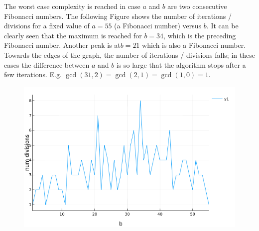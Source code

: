 The worst case complexity is reached in case $a$ and $b$ are two consecutive Fibonacci numbers. The following Figure shows the number of iterations / divisions  for a fixed value of $a=55$ (a Fibonacci number) versus $b$. It can be clearly seen that the maximum is reached for $b=34$, which is the preceding Fibonacci number. Another peak is at$b=21$ which is also a Fibonacci number. Towards the edges of the graph, the number of iterations / divisions falls; in these cases the difference between $a$ and $b$ is so large that the algorithm stops after a few iterations. E.g. $\gcd(31,2) = \gcd(2,1) = \gcd(1,0) = 1$.


\begin{figure}[H]
	\includegraphics[scale=0.5]{images/gcd_num_div.png}
\end{figure}

